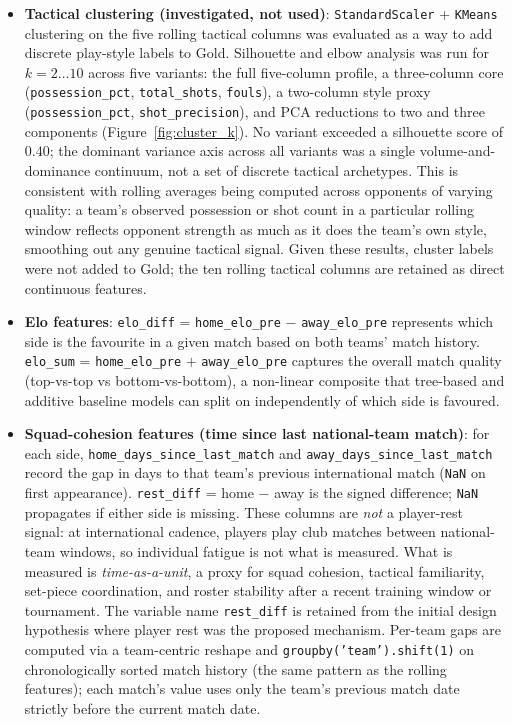 \documentclass[conference]{IEEEtran}
\begin{document}
\begin{itemize}
  \item \textbf{Tactical clustering (investigated, not used)}: \texttt{StandardScaler}
  + \texttt{KMeans} clustering on the five rolling tactical columns was evaluated as a
  way to add discrete play-style labels to Gold.  Silhouette and elbow analysis was
  run for $k = 2\ldots10$ across five variants: the full five-column profile, a
  three-column core (\texttt{possession\_pct}, \texttt{total\_shots}, \texttt{fouls}),
  a two-column style proxy (\texttt{possession\_pct}, \texttt{shot\_precision}), and
  PCA reductions to two and three components (Figure~\ref{fig:cluster_k}).
  No variant exceeded a silhouette score of $0.40$; the dominant variance axis across
  all variants was a single volume-and-dominance continuum, not a set of discrete
  tactical archetypes.  This is consistent with rolling averages being computed across
  opponents of varying quality: a team's observed possession or shot count in a
  particular rolling window reflects opponent strength as much as it does the team's
  own style, smoothing out any genuine tactical signal.  Given these results, cluster
  labels were not added to Gold; the ten rolling tactical columns are retained as
  direct continuous features.

  \item \textbf{Elo features}: \texttt{elo\_diff} = \texttt{home\_elo\_pre}
  $-$ \texttt{away\_elo\_pre} represents which side is the favourite in a given
  match based on both teams' match history.  \texttt{elo\_sum} =
  \texttt{home\_elo\_pre} $+$ \texttt{away\_elo\_pre} captures the overall match
  quality (top-vs-top vs bottom-vs-bottom), a non-linear composite that
  tree-based and additive baseline models can split on independently of which
  side is favoured.

  \item \textbf{Squad-cohesion features (time since last national-team match)}:
  for each side, \texttt{home\_days\_since\_last\_match} and
  \texttt{away\_days\_since\_last\_match} record the gap in days to that team's
  previous international match (\texttt{NaN} on first appearance).
  \texttt{rest\_diff} = home $-$ away is the signed difference; \texttt{NaN}
  propagates if either side is missing.  These columns are \emph{not} a
  player-rest signal: at international cadence, players play club
  matches between national-team windows, so individual fatigue is not what
  is measured.  What is measured is \emph{time-as-a-unit}, a proxy for
  squad cohesion, tactical familiarity, set-piece coordination, and roster 
  stability after a recent training window or tournament.  
  The variable name \texttt{rest\_diff} is retained
  from the initial design hypothesis where player rest was the proposed
  mechanism.  Per-team gaps are computed via a team-centric reshape and
  \texttt{groupby('team').shift(1)} on chronologically sorted match
  history (the same pattern as the rolling features); each match's value
  uses only the team's previous match date strictly before the current
  match date.


\end{itemize}
\end{document}
